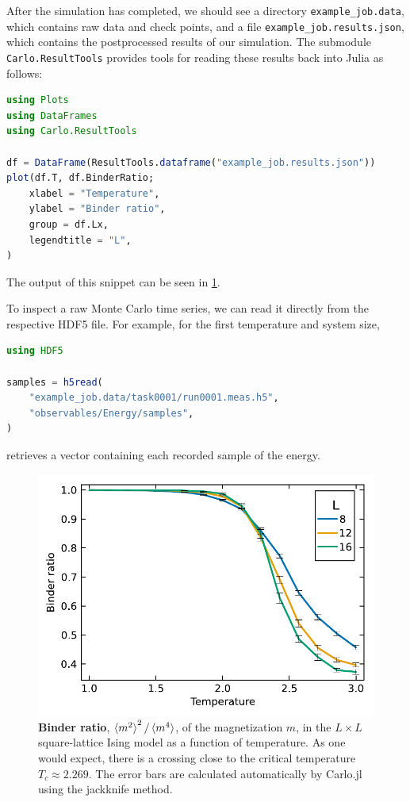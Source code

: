 \documentclass{SciPost}
\begin{document}
After the simulation has completed, we should see a directory \texttt{example\_{}job.data}, which contains raw data and check points, and a file \texttt{example\_{}job.results.json}, which contains the postprocessed results of our simulation.
The submodule \texttt{Carlo.ResultTools} provides tools for reading these results back into Julia as follows:
\begin{lstlisting}[language=julia]
using Plots
using DataFrames
using Carlo.ResultTools

df = DataFrame(ResultTools.dataframe("example_job.results.json"))
plot(df.T, df.BinderRatio;
    xlabel = "Temperature",
    ylabel = "Binder ratio",
    group = df.Lx,
    legendtitle = "L",
)
\end{lstlisting}
The output of this snippet can be seen in \cref{fig:binder}.

To inspect a raw Monte Carlo time series, we can read it directly from the respective HDF5 file. For example, for the first temperature and system size,
\begin{lstlisting}[language=julia]
using HDF5

samples = h5read(
    "example_job.data/task0001/run0001.meas.h5",
    "observables/Energy/samples",
)
\end{lstlisting}
retrieves a vector containing each recorded sample of the energy.
\begin{figure}
\begin{center}
\includegraphics[scale=0.625]{figs/binder_ratio.pdf}
\end{center}
\caption{\textbf{Binder ratio}, $\braket{m^2}^2/\braket{m^4}$, of the magnetization $m$, in the $L\times L$ square-lattice Ising model as a function of temperature. As one would expect, there is a crossing close to the critical temperature $T_c \approx 2.269$. The error bars are calculated automatically by Carlo.jl using the jackknife method.}
\label{fig:binder}
\end{figure}
\end{document}
